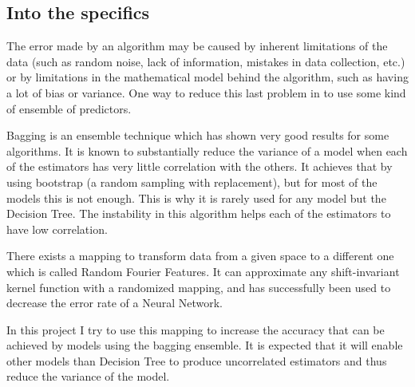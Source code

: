 \documentclass{article}
\begin{document}
    \subsection{Into the specifics}
    The error made by an algorithm may be caused by inherent limitations of the
    data (such as random noise, lack of information, mistakes in data
    collection, etc.) or by limitations in the mathematical model behind the
    algorithm, such as having a lot of bias or variance. One way to reduce this
    last problem in to use some kind of ensemble of predictors.

    Bagging\cite{breiman94} is an ensemble technique which has shown very good results for
    some algorithms. It is known to substantially reduce the variance of a model when each of the estimators has very little correlation with the others. It
    achieves that by using bootstrap (a random sampling with
    replacement), but for most of the models this is not enough. This is why it is rarely used for any model but the Decision Tree. The instability in this
    algorithm helps each of the estimators to have low correlation.

    There exists a mapping to transform data from a given space to a different one which is called Random Fourier Features\cite{rahimi07}. It can approximate any
    shift-invariant kernel function with a randomized mapping, and has successfully
    been used to decrease the error rate of a Neural Network\cite{zhangs17}.

    In this project I try to use this mapping to increase the accuracy that can
    be achieved by models using the bagging ensemble. It is expected that it will
    enable other models than Decision Tree to produce uncorrelated estimators and
    thus reduce the variance of the model.
\end{document}
